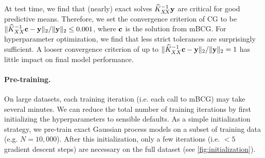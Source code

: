 At test time, we find that (nearly) exact solves $\widehat {K}_{X \! X}^{-1} \mathbf{y}$  are critical for good predictive means.
Therefore, we set the convergence criterion of CG to be $\Vert \widehat{K}_{XX}^{-1} \mathbf{c} - \mathbf{y} \Vert_2 / \Vert \mathbf{y} \Vert_2 \leq 0.001$, where $\mathbf{c}$ is the solution from mBCG.
For hyperparameter optimization, we find that less strict tolerances are surprisingly sufficient.
A looser convergence criterion of up to $\Vert \widehat{K}_{XX}^{-1} \mathbf{c} - \mathbf{y} \Vert_2 / \Vert \mathbf{y} \Vert_2 = 1$ has little impact on final model performance.


\paragraph{Pre-training.}
On large datasets, each training iteration (i.e. each call to mBCG) may take several minutes.
We can reduce the total number of training iterations by first initializing the hyperparameters to sensible defaults.
As a simple initialization strategy, we pre-train exact Gaussian process models on a subset of training data (e.g. $N=10,\!000$).
After this initialization, only a few iterations (i.e. $< 5$ gradient descent steps) are necessary on the full dataset (see \cref{fig:initialization}).

